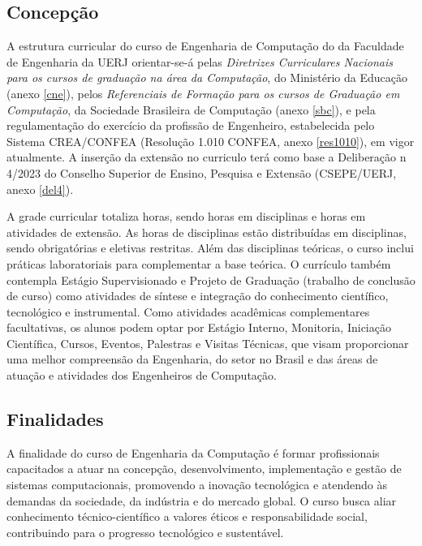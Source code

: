 \subsection{Concepção}

A estrutura curricular do curso de Engenharia de Computação do \desc da Faculdade de Engenharia da UERJ orientar-se-á pelas \textit{Diretrizes Curriculares Nacionais para os cursos de graduação na área da Computação}, do Ministério da Educação (anexo \ref{cne}), pelos \textit{Referenciais de Formação para os cursos de Graduação em Computação}, da Sociedade Brasileira de Computação (anexo \ref{sbc}), e pela regulamentação do exercício da profissão de Engenheiro, estabelecida pelo Sistema CREA/CONFEA (Resolução 1.010 CONFEA, anexo \ref{res1010}), em vigor atualmente. A inserção da extensão no curriculo terá como base a Deliberação n\textordmasculine{} 4/2023 do Conselho Superior de Ensino, Pesquisa e Extensão (CSEPE/UERJ, anexo \ref{del4}).

A grade curricular totaliza \totalhoras horas, sendo \hobrigatorias horas em disciplinas e \hextensao horas em atividades de extensão. As \hobrigatorias horas de disciplinas estão distribuídas em \ndisciplinas disciplinas, sendo \nobrigatorias  obrigatórias e \neletivas eletivas restritas. Além das disciplinas teóricas, o curso inclui práticas laboratoriais para complementar a base teórica. O currículo também contempla Estágio Supervisionado e Projeto de Graduação (trabalho de conclusão de curso) como atividades de síntese e integração do conhecimento científico, tecnológico e instrumental. Como atividades acadêmicas complementares facultativas, os alunos podem optar por Estágio Interno, Monitoria, Iniciação Científica, Cursos, Eventos, Palestras e Visitas Técnicas, que visam proporcionar uma melhor compreensão da Engenharia, do setor no Brasil e das áreas de atuação e atividades dos Engenheiros de Computação.

\subsection{Finalidades}

A finalidade do curso de Engenharia da Computação é formar profissionais capacitados a atuar na concepção, desenvolvimento, implementação e gestão de sistemas computacionais, promovendo a inovação tecnológica e atendendo às demandas da sociedade, da indústria e do mercado global. O curso busca aliar conhecimento técnico-científico a valores éticos e responsabilidade social, contribuindo para o progresso tecnológico e sustentável.

